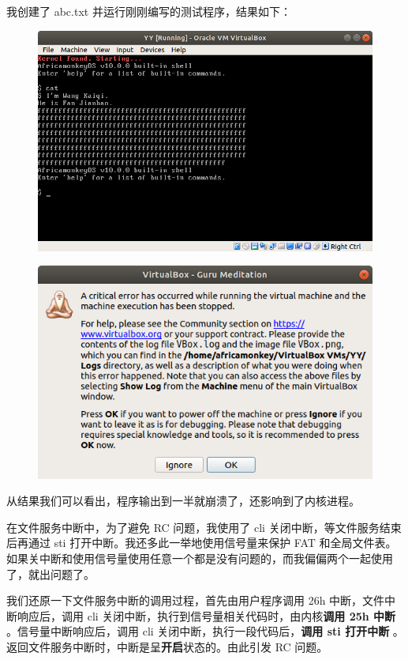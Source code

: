 \documentclass[a4paper]{article}
\begin{document}
我创建了 abc.txt 并运行刚刚编写的测试程序，结果如下：

\begin{figure}[!hbp]
\centering
\includegraphics[scale=.5]{pics/1.png}
\end{figure}

\begin{figure}[!hbp]
\centering
\includegraphics[scale=.5]{pics/2.png}
\end{figure}



从结果我们可以看出，程序输出到一半就崩溃了，还影响到了内核进程。

在文件服务中断中，为了避免 RC 问题，我使用了 cli 关闭中断，等文件服务结束后再通过 sti 打开中断。我还多此一举地使用信号量来保护 FAT 和全局文件表。如果关中断和使用信号量使用任意一个都是没有问题的，而我偏偏两个一起使用了，就出问题了。

我们还原一下文件服务中断的调用过程，首先由用户程序调用 26h 中断，文件中断响应后，调用 cli 关闭中断，执行到信号量相关代码时，由内核\textbf{调用 25h 中断} 。信号量中断响应后，调用 cli 关闭中断，执行一段代码后，\textbf{调用 sti 打开中断} 。返回文件服务中断时，中断是呈\textbf{开启}状态的。由此引发 RC 问题。
\end{document}
